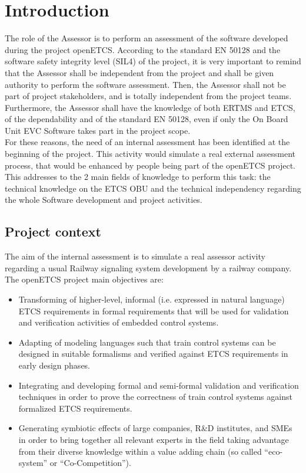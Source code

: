 \documentclass[openetcs]{template/openetcs_article}
\begin{document}
\section{Introduction}
The role of the Assessor is to perform an assessment of the software developed during the project openETCS. According to the standard EN 50128 and the software
safety integrity level (SIL4) of the project, it is very important to remind that the Assessor shall be independent from the project and shall be given
authority to perform the software assessment. Then, the Assessor shall not be part of project stakeholders, and is totally independent from the project teams.
Furthermore, the Assessor shall have the knowledge of both ERTMS and ETCS, of the dependability and of the standard EN 50128, even if only the On Board Unit EVC
Software takes part in the project scope.
\\
For these reasons, the need of an internal assessment has been identified at the beginning of the project. This activity would simulate a real external
assessment process, that would be enhanced by people being part of the openETCS project. This addresses to the 2 main fields of knowledge to perform this task:
the technical knowledge on the ETCS OBU and the technical independency regarding the whole Software development and project activities.

\subsection{Project context}
The aim of the internal assessment is to simulate a real assessor activity regarding a usual Railway signaling system development by a railway company. The openETCS project main objectives are:
\begin{itemize}
\item Transforming of higher-level, informal (i.e. expressed in natural language) ETCS requirements in formal requirements that will be used for
validation and verification activities of embedded control systems.
\item Adapting of modeling languages such that train control systems can be designed in suitable formalisms and verified against ETCS requirements in early
design phases.
\item Integrating and developing formal and semi-formal validation and verification techniques in order to prove the correctness of train control systems
against formalized ETCS requirements.
\item Generating symbiotic effects of large companies, R\&D institutes, and SMEs in order to bring together all relevant experts in the field taking advantage
from their diverse knowledge within a value adding chain (so called “eco-system” or “Co-Competition”).
\end{itemize}
\end{document}

